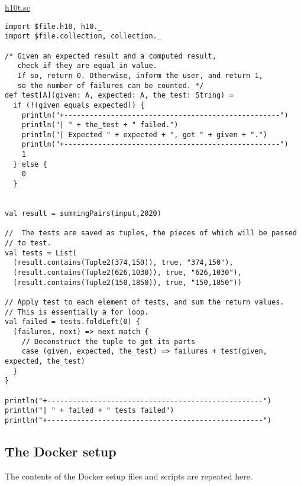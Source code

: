 \documentclass[11pt]{article}
\begin{document}
\href{./testing/h10/h10t.sc}{h10t.sc}
\begin{verbatim}
import $file.h10, h10._
import $file.collection, collection._

/* Given an expected result and a computed result,
   check if they are equal in value.
   If so, return 0. Otherwise, inform the user, and return 1,
   so the number of failures can be counted. */
def test[A](given: A, expected: A, the_test: String) =
  if (!(given equals expected)) {
    println("+---------------------------------------------------")
    println("| " + the_test + " failed.")
    println("| Expected " + expected + ", got " + given + ".")
    println("+---------------------------------------------------")
    1
  } else {
    0
  }


val result = summingPairs(input,2020)

//  The tests are saved as tuples, the pieces of which will be passed
// to test.
val tests = List(
  (result.contains(Tuple2(374,150)), true, "374,150"),
  (result.contains(Tuple2(626,1030)), true, "626,1030"),
  (result.contains(Tuple2(150,1850)), true, "150,1850"))

// Apply test to each element of tests, and sum the return values.
// This is essentially a for loop.
val failed = tests.foldLeft(0) {
  (failures, next) => next match {
    // Deconstruct the tuple to get its parts
    case (given, expected, the_test) => failures + test(given, expected, the_test)
  }
}

println("+---------------------------------------------------")
println("| " + failed + " tests failed")
println("+---------------------------------------------------")
\end{verbatim}

\subsection*{The Docker setup}
\label{sec:org4c165a6}
The contents of the Docker setup files and scripts are repeated here.
\end{document}
